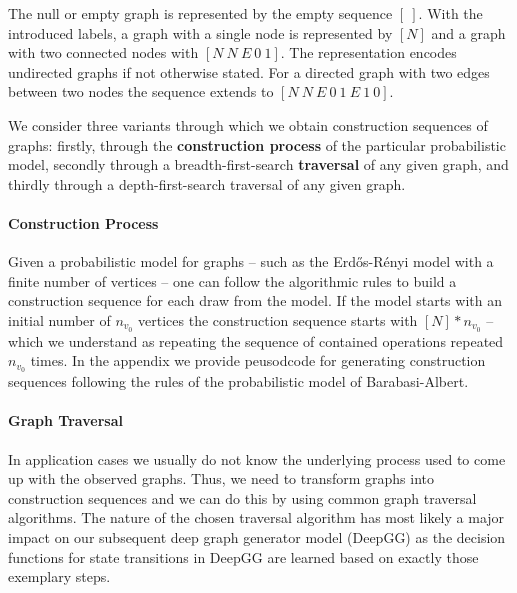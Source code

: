 \documentclass{article}
\begin{document}
The null or empty graph is represented by the empty sequence $\left[~\right]$.
With the introduced labels, a graph with a single node is represented by $\left[ N \right]$ and a graph with two connected nodes with $\left[ N ~ N ~ E ~ 0 ~ 1 \right]$.
The representation encodes undirected graphs if not otherwise stated.
For a directed graph with two edges between two nodes the sequence extends to $\left[ N ~ N ~ E ~ 0 ~ 1 ~ E ~ 1 ~ 0 \right]$.

We consider three variants through which we obtain construction sequences of graphs: firstly, through the \textbf{construction process} of the particular probabilistic model, secondly through a breadth-first-search \textbf{traversal} of any given graph, and thirdly through a depth-first-search traversal of any given graph.




\paragraph{Construction Process}
Given a probabilistic model for graphs -- such as the Erdős-Rényi model with a finite number of vertices -- one can follow the algorithmic rules to build a construction sequence for each draw from the model.
If the model starts with an initial number of $n_{v_0}$ vertices the construction sequence starts with $\left[ N \right] * n_{v_0}$ -- which we understand as repeating the sequence of contained operations repeated $n_{v_0}$ times.
In the appendix we provide peusodcode for generating construction sequences following the rules of the probabilistic model of Barabasi-Albert.


\paragraph{Graph Traversal}
In application cases we usually do not know the underlying process used to come up with the observed graphs.
Thus, we need to transform graphs into construction sequences and we can do this by using common graph traversal algorithms.
The nature of the chosen traversal algorithm has most likely a major impact on our subsequent deep graph generator model (DeepGG) as the decision functions for state transitions in DeepGG are learned based on exactly those exemplary steps.
\end{document}
